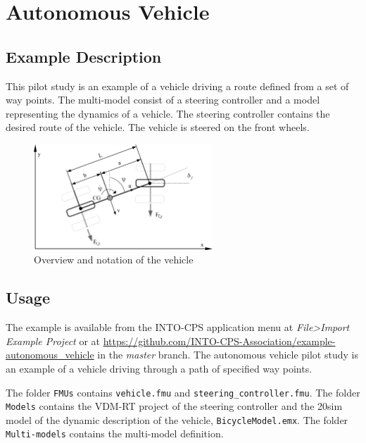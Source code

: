 \section{Autonomous Vehicle}
\label{sec:bicycle}

\subsection{Example Description}
This pilot study is an example of a vehicle driving a route defined from a set of way points. The multi-model consist of a steering controller and a model representing the dynamics of a vehicle. The steering controller contains the desired route of the vehicle. The vehicle is steered on the front wheels. 

\begin{figure}[htbp]
\begin{center}
\includegraphics[width=0.6\textwidth]{vehicle/bicycle.png}
\caption{Overview and notation of the vehicle}
\label{fig:bicyclemodel_overview}
\end{center}
\end{figure}

\subsection{Usage} \label{sec:bicycle_usage}
The example is available from the INTO-CPS application menu at \emph{File>Import Example Project} or at  \url{https://github.com/INTO-CPS-Association/example-autonomous\_vehicle} in the \emph{master} branch. The autonomous vehicle pilot study is an example of a vehicle driving through a path of specified way points.  

The folder \texttt{FMUs} contains \texttt{vehicle.fmu} and \texttt{steering\_controller.fmu}. The folder \texttt{Models} contains the VDM-RT project of the steering controller and the 20sim model of the dynamic description of the vehicle, \texttt{BicycleModel.emx}. The folder \texttt{Multi-models} contains the multi-model definition.  

